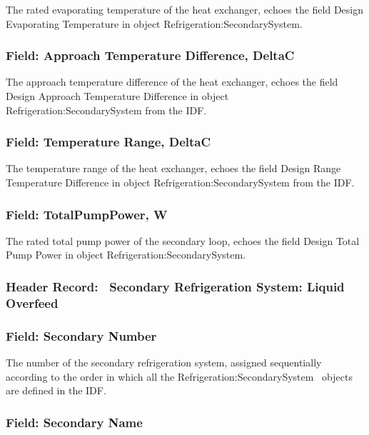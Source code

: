 The rated evaporating temperature of the heat exchanger, echoes the field Design Evaporating Temperature in object Refrigeration:SecondarySystem.

\subsubsection{Field: Approach Temperature Difference, DeltaC}\label{field-approach-temperature-difference-deltac-1}

The approach temperature difference of the heat exchanger, echoes the field Design Approach Temperature Difference in object Refrigeration:SecondarySystem from the IDF.

\subsubsection{Field: Temperature Range, DeltaC}\label{field-temperature-range-deltac}

The temperature range of the heat exchanger, echoes the field Design Range Temperature Difference in object Refrigeration:SecondarySystem from the IDF.

\subsubsection{Field: TotalPumpPower, W}\label{field-totalpumppower-w}

The rated total pump power of the secondary loop, echoes the field Design Total Pump Power in object Refrigeration:SecondarySystem.

\subsubsection{Header Record:~ Secondary Refrigeration System: Liquid Overfeed}\label{header-record-secondary-refrigeration-system-liquid-overfeed}

\subsubsection{Field: Secondary Number}\label{field-secondary-number-2}

The number of the secondary refrigeration system, assigned sequentially according to the order in which all the Refrigeration:SecondarySystem~ objects are defined in the IDF.

\subsubsection{Field: Secondary Name}\label{field-secondary-name-1}

